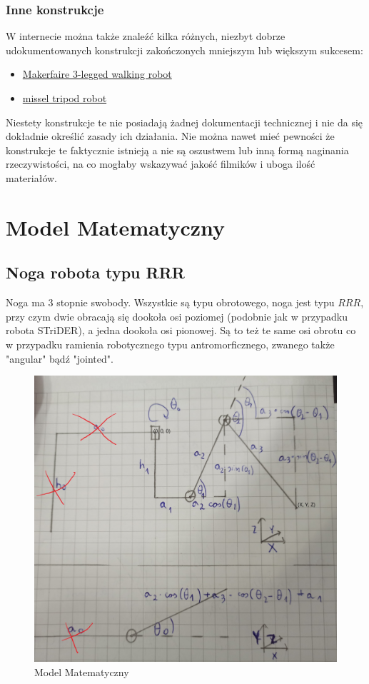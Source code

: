\documentclass[a4paper,13pt]{article}
\begin{document}
\subsubsection{Inne konstrukcje}
W internecie można także znaleźć kilka różnych, niezbyt dobrze udokumentowanych konstrukcji zakończonych mniejszym lub większym sukcesem:
\begin{itemize}
\item \href{https://makerfaire.com/maker/entry/71669/}{Makerfaire 3-legged walking robot}
\item \href{https://youtu.be/HGEhCCUgFMg}{missel tripod robot}
\end{itemize}

Niestety konstrukcje te nie posiadają żadnej dokumentacji technicznej i nie da się dokładnie określić zasady ich działania. Nie można nawet mieć pewności że konstrukcje te faktycznie istnieją a nie są oszustwem lub inną formą naginania rzeczywistości, na co mogłaby wskazywać jakość filmików i uboga ilość materiałów.

\section{Model Matematyczny}

\subsection{Noga robota typu RRR}
Noga ma 3 stopnie swobody. Wszystkie są typu obrotowego, noga jest typu $RRR$, przy czym dwie obracają się dookoła osi poziomej (podobnie jak w przypadku robota STriDER), a jedna dookoła osi pionowej. Są to też te same osi obrotu co w przypadku ramienia robotycznego typu antromorficznego, zwanego także "angular" bądź "jointed".

\begin{figure}[H]
\includegraphics[width=\textwidth]{img/math_model.jpg}
\caption{Model Matematyczny}
\label{math_model}
\end{figure}
\end{document}
